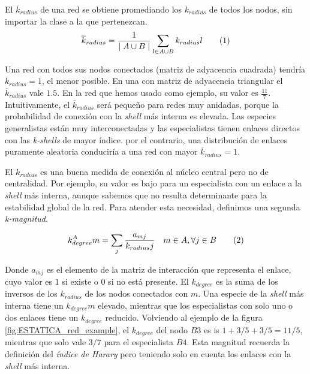 \begin{theo} 
El \textit{$\overline k_{radius}$} de una red se obtiene promediando los ${k}_{radius}$ de todos los nodos, sin importar la clase a la que pertenezcan.
\begin{align*}
\displaystyle
\overline {k}_{radius} = \frac{1}{\mid A \cup B \mid}\sum\limits_{l \in A \cup B} k_{radius}l
\stepcounter{equation}\tag{\theequation}\label{avgkradius}
\end{align*}
\label{ESTATICA_avgkradius}
\end{theo}

Una red con todos sus nodos conectados (matriz de adyacencia cuadrada) tendría $\overline {k}_{radius}=1$, el menor posible. En una con matriz de adyacencia triangular el $\overline {k}_{radius}$ vale $1.5$. En la red que hemos usado como ejemplo, su valor es $\frac{11}{7}$. Intuitivamente, el $\overline {k}_{radius}$ será pequeño para redes muy anidadas, porque la probabilidad de conexión con la \textit{shell} más interna es elevada. Las especies generalistas están muy interconectadas y las especialistas tienen enlaces directos con las \textit{k-shells} de mayor índice. por el contrario, una distribución de enlaces puramente aleatoria conduciría a una red con mayor $\overline {k}_{radius}=1$.

El ${k}_{radius}$ es una buena medida de conexión al núcleo central pero no de centralidad. Por ejemplo, su valor es bajo para un especialista con un enlace a la \textit{shell} más interna, aunque sabemos que no resulta determinante para la estabilidad global de la red. Para atender esta necesidad, definimos una segunda \textit{k-magnitud}.

\begin{theo} 
\begin{align*}
\displaystyle
k^A_{degree}m = \sum\limits_{j} \frac{a_{mj} }{k_{radius}j}  \quad   m \in A, \forall j \in B
\stepcounter{equation}\tag{\theequation}
\end{align*}
\label{kdegree}
\end{theo}

Donde $a_{mj}$ es el elemento de la matriz de interacción que representa el enlace, cuyo valor es $1$ si existe o $0$ si no está presente. El $k_{degree}$ es la suma de los inversos de los $k_{radius}$ de los nodos conectados con $m$. Una especie de la \textit{shell} más interna tiene un $k_{degree}m$ elevado,  mientras que los especialistas con solo uno o dos enlaces tiene un $k_{degree}$ reducido. Volviendo al ejemplo de la figura \ref{fig:ESTATICA_red_example}, el $k_{degree}$ del nodo $B3$ es is $1+3/5+3/5 = 11/5$, mientras que solo vale $3/7$ para el especialista $B4$. Esta magnitud recuerda la definición del \textit{índice de Harary} \cite{plavvsic1993harary} pero teniendo solo en cuenta los enlaces con la \textit{shell} más interna.


